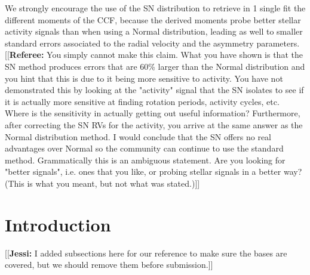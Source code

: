 \documentclass[11pt, oneside]{article}
\newcommand{\jessi}[1]{{\color{Purple}[[\textbf{Jessi: }#1]]}}
\newcommand{\comment}[1]{{\color{red}[[\textbf{Referee: }#1]]}}
\begin{document}
We strongly encourage the use of the SN distribution to retrieve in 1 single fit the different moments of the CCF, because the derived moments probe better stellar activity signals than when using a Normal distribution, leading as well to smaller standard errors associated to the radial velocity and the asymmetry parameters.
\comment{You simply cannot make this claim. What you have shown is that the SN method produces errors that are 60\% larger than the Normal distribution and you hint that this is due to it being more sensitive to activity. You have not demonstrated this by looking at the "activity" signal that the SN isolates to see if it is actually more sensitive at finding rotation periods, activity cycles, etc. Where is the sensitivity in actually getting out useful information? Furthermore, after correcting the SN RVs for the activity, you arrive at the same answer as the Normal distribution method. I would conclude that the SN offers no real advantages over Normal so the community can continue to use the standard method.
Grammatically this is an ambiguous statement. Are you looking for "better signals", i.e. ones that you like, or probing stellar signals in a better way? (This is what you meant, but not what was stated.)}


\section{Introduction}
\label{intro}
\jessi{I added subsections here for our reference to make sure the bases are covered, but we should remove them before submission.}


\end{document}
